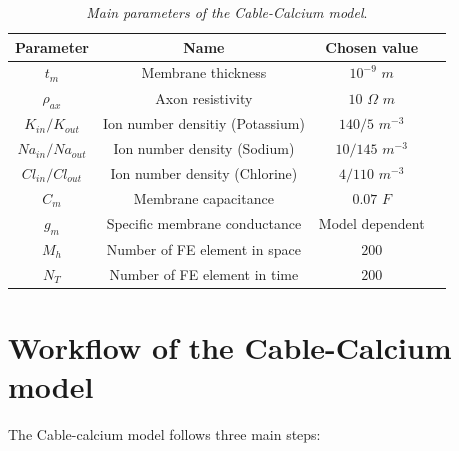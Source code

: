\documentclass[12pt, a4paper]{report}
\begin{document}
\begin{table}[H]
	\begin{center}
		\begin{tabular}{ |c|c|c|c| } 
			\hline
			\textbf{Parameter} & \textbf{Name} & \textbf{Chosen value} \\
			\hline
			$t_m$ & Membrane thickness & $10^{-9}$ $ m$ \\ 
			\hline
			$\rho_{ax}$ & Axon resistivity & $10$ $\Omega$ $ m$ \\
			\hline
			$K_{in}/K_{out}$ & Ion number densitiy (Potassium) & $140/5$ $m^{-3}$ \\
			\hline
			$Na_{in}/Na_{out}$ & Ion number density (Sodium) & $10/145$ $m^{-3}$ \\
			\hline
			$Cl_{in}/Cl_{out}$ & Ion number density (Chlorine) & $4/110$ $m^{-3}$ \\
			\hline
			$C_m$ & Membrane capacitance & $0.07$ $F$ \\
			\hline
			$g_m$ & Specific membrane conductance & Model dependent \\
			\hline
			$M_h$ & Number of FE element in space & $200$ \\
			\hline
			$N_T$ & Number of FE element in time & $200$ \\
			
			
			\hline
		\end{tabular}
		
	\end{center}
	\caption{\textit{Main parameters of the Cable-Calcium model}. \cite{47}} \label{param}
\end{table}

\section{Workflow of the Cable-Calcium model}


The Cable-calcium model follows three main steps:
\end{document}
